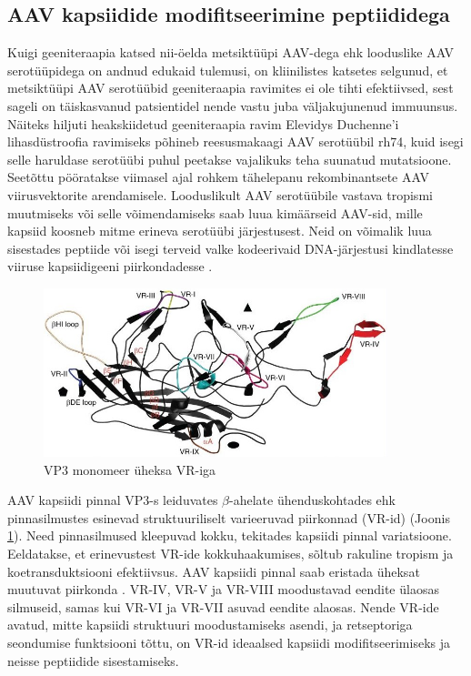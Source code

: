 \documentclass{trkut}%
\begin{document}
\subsection{AAV kapsiidide modifitseerimine peptiididega}

Kuigi geeniteraapia katsed nii-öelda metsiktüüpi AAV-dega ehk looduslike AAV serotüüpidega on andnud edukaid tulemusi, on kliinilistes katsetes selgunud, et metsiktüüpi AAV serotüübid geeniteraapia ravimites ei ole tihti efektiivsed, sest sageli on täiskasvanud patsientidel nende vastu juba väljakujunenud immuunsus. Näiteks hiljuti heakskiidetud geeniteraapia ravim Elevidys Duchenne’i lihasdüstroofia ravimiseks põhineb reesusmakaagi AAV serotüübil rh74, kuid isegi selle haruldase serotüübi puhul peetakse vajalikuks teha suunatud mutatsioone. \parencite{elevidys}
Seetõttu pööratakse viimasel ajal rohkem tähelepanu rekombinantsete AAV viirusvektorite arendamisele. Looduslikult AAV serotüübile vastava tropismi muutmiseks või selle võimendamiseks saab luua kimäärseid AAV-sid, mille kapsiid koosneb mitme erineva serotüübi järjestusest. Neid on võimalik luua sisestades peptiide või isegi terveid valke kodeerivaid DNA-järjestusi kindlatesse viiruse kapsiidigeeni piirkondadesse \parencite{pupo}. 

\begin{figure}[htbp]
	\includegraphics[width=10cm]{vr11.jpg}
	\caption{VP3 monomeer üheksa VR-iga}
	\label{vrjon}
\end{figure}

AAV kapsiidi pinnal VP3-s leiduvates $\beta$-ahelate ühenduskohtades ehk pinnasilmustes esinevad struktuuriliselt varieeruvad piirkonnad (VR-id) (Joonis \ref{vrjon}). Need pinnasilmused kleepuvad kokku, tekitades kapsiidi pinnal variatsioone. Eeldatakse, et erinevustest VR-ide kokkuhaakumises, sõltub rakuline tropism ja koetransduktsiooni efektiivsus. \parencite{vr-basic} AAV kapsiidi pinnal saab eristada üheksat muutuvat piirkonda \parencite{vrjoonis}. VR-IV, VR-V ja VR-VIII moodustavad eendite ülaosas silmuseid, samas kui VR-VI ja VR-VII asuvad eendite alaosas. Nende VR-ide avatud, mitte kapsiidi struktuuri moodustamiseks asendi, ja retseptoriga seondumise funktsiooni tõttu, on VR-id ideaalsed kapsiidi modifitseerimiseks ja neisse peptiidide sisestamiseks. \parencite{modifitseerimine}
\end{document}
